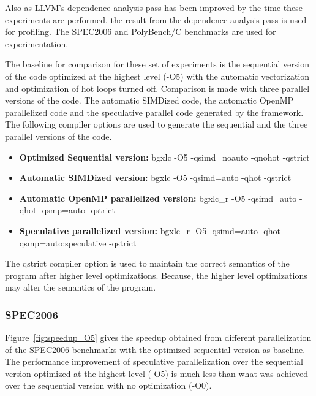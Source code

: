 \documentclass[10pt]{report}          %
\begin{document}
Also as LLVM's dependence analysis pass has been improved by the time these experiments are performed, the result from the dependence analysis pass is used for profiling.  The SPEC2006 and PolyBench/C benchmarks are used for experimentation.

The baseline for comparison for these set of experiments is the sequential version of the code optimized at the highest level (-O5) with the automatic vectorization and optimization of hot loops turned off.  Comparison is made with three parallel versions of the code.  The automatic SIMDized code, the automatic OpenMP parallelized code and the speculative parallel code generated by the framework.  The following compiler options are used to generate the sequential and the three parallel versions of the code. \\

\begin{itemize}
\item \textbf{Optimized Sequential version:} bgxlc -O5 -qsimd=noauto -qnohot -qstrict 
\item \textbf{Automatic SIMDized version:} bgxlc -O5 -qsimd=auto -qhot -qstrict 
\item \textbf{Automatic OpenMP parallelized version:} bgxlc\_r -O5 -qsimd=auto -qhot -qsmp=auto -qstrict 
\item \textbf{Speculative parallelized version:} bgxlc\_r -O5 -qsimd=auto -qhot -qsmp=auto:speculative -qstrict
\end{itemize}

The \-qstrict compiler option is used to maintain the correct semantics of the program after higher level optimizations.  Because, the higher level optimizations may alter the semantics of the program. \\

\subsubsection{SPEC2006}
Figure~\ref{fig:speedup_O5} gives the speedup obtained from different parallelization of the SPEC2006 benchmarks with the optimized sequential version as baseline. The performance improvement of speculative parallelization over the sequential version optimized at the highest level (-O5) is much less than what was achieved over the sequential version with no optimization (-O0). \\
\end{document}
